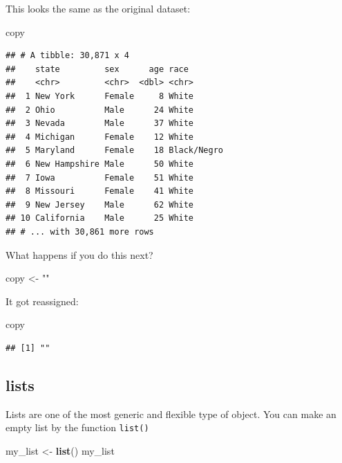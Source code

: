 \documentclass[
]{book}
\newenvironment{Shaded}{\begin{snugshade}}{\end{snugshade}}
\newcommand{\KeywordTok}[1]{\textcolor[rgb]{0.13,0.29,0.53}{\textbf{#1}}}
\newcommand{\NormalTok}[1]{#1}
\newcommand{\StringTok}[1]{\textcolor[rgb]{0.31,0.60,0.02}{#1}}
\theoremstyle{definition}
\theoremstyle{definition}
\theoremstyle{definition}
\theoremstyle{remark}
\begin{document}
This looks the same as the original dataset:

\begin{Shaded}
\begin{Highlighting}[]
\NormalTok{copy}
\end{Highlighting}
\end{Shaded}

\begin{verbatim}
## # A tibble: 30,871 x 4
##    state         sex      age race       
##    <chr>         <chr>  <dbl> <chr>      
##  1 New York      Female     8 White      
##  2 Ohio          Male      24 White      
##  3 Nevada        Male      37 White      
##  4 Michigan      Female    12 White      
##  5 Maryland      Female    18 Black/Negro
##  6 New Hampshire Male      50 White      
##  7 Iowa          Female    51 White      
##  8 Missouri      Female    41 White      
##  9 New Jersey    Male      62 White      
## 10 California    Male      25 White      
## # ... with 30,861 more rows
\end{verbatim}

What happens if you do this next?

\begin{Shaded}
\begin{Highlighting}[]
\NormalTok{copy <{-}}\StringTok{ ""}
\end{Highlighting}
\end{Shaded}

It got reassigned:

\begin{Shaded}
\begin{Highlighting}[]
\NormalTok{copy}
\end{Highlighting}
\end{Shaded}

\begin{verbatim}
## [1] ""
\end{verbatim}

\hypertarget{lists}{%
\subsection{lists}\label{lists}}

Lists are one of the most generic and flexible type of object. You can make an empty list by the function \texttt{list()}

\begin{Shaded}
\begin{Highlighting}[]
\NormalTok{my\_list <{-}}\StringTok{ }\KeywordTok{list}\NormalTok{()}
\NormalTok{my\_list}
\end{Highlighting}
\end{Shaded}
\end{document}
